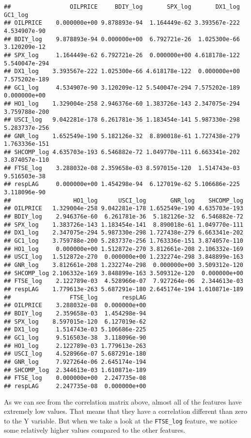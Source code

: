 \documentclass[
]{article}
\begin{document}
\begin{verbatim}
##                 OILPRICE     BDIY_log       SPX_log       DX1_log       GC1_log
## OILPRICE    0.000000e+00 9.878893e-94  1.164449e-62 3.393567e-222  4.534907e-90
## BDIY_log    9.878893e-94 0.000000e+00  6.792721e-26  1.025300e-66  3.120209e-12
## SPX_log     1.164449e-62 6.792721e-26  0.000000e+00 4.618178e-122 5.540047e-294
## DX1_log    3.393567e-222 1.025300e-66 4.618178e-122  0.000000e+00 7.575202e-189
## GC1_log     4.534907e-90 3.120209e-12 5.540047e-294 7.575202e-189  0.000000e+00
## HO1_log    1.329004e-258 2.946376e-60 1.383726e-143 2.347075e-294 3.759788e-200
## USCI_log   9.042281e-178 6.261781e-36 1.183454e-141 5.987330e-298 5.283737e-256
## GNR_log    1.652549e-190 5.182126e-32  8.890018e-61 1.727438e-279 1.763336e-151
## SHCOMP_log 4.635703e-193 6.546882e-72 1.049770e-111 6.663341e-202 3.874057e-110
## FTSE_log    3.288032e-08 2.359658e-03 8.597015e-120  1.514743e-03  9.516503e-38
## respLAG     0.000000e+00 1.454298e-94  6.127019e-62 5.106686e-225  3.118096e-90
##                  HO1_log      USCI_log       GNR_log    SHCOMP_log
## OILPRICE   1.329004e-258 9.042281e-178 1.652549e-190 4.635703e-193
## BDIY_log    2.946376e-60  6.261781e-36  5.182126e-32  6.546882e-72
## SPX_log    1.383726e-143 1.183454e-141  8.890018e-61 1.049770e-111
## DX1_log    2.347075e-294 5.987330e-298 1.727438e-279 6.663341e-202
## GC1_log    3.759788e-200 5.283737e-256 1.763336e-151 3.874057e-110
## HO1_log     0.000000e+00 1.512872e-270 3.812661e-208 2.106332e-169
## USCI_log   1.512872e-270  0.000000e+00 1.232274e-298 3.848899e-163
## GNR_log    3.812661e-208 1.232274e-298  0.000000e+00 3.509312e-120
## SHCOMP_log 2.106332e-169 3.848899e-163 3.509312e-120  0.000000e+00
## FTSE_log    2.122789e-03  4.528966e-07  7.927264e-06  2.344613e-03
## respLAG    1.779613e-263 5.687291e-180 2.645174e-194 1.610871e-189
##                 FTSE_log       respLAG
## OILPRICE    3.288032e-08  0.000000e+00
## BDIY_log    2.359658e-03  1.454298e-94
## SPX_log    8.597015e-120  6.127019e-62
## DX1_log     1.514743e-03 5.106686e-225
## GC1_log     9.516503e-38  3.118096e-90
## HO1_log     2.122789e-03 1.779613e-263
## USCI_log    4.528966e-07 5.687291e-180
## GNR_log     7.927264e-06 2.645174e-194
## SHCOMP_log  2.344613e-03 1.610871e-189
## FTSE_log    0.000000e+00  2.247735e-08
## respLAG     2.247735e-08  0.000000e+00
\end{verbatim}

As we can see from the correlation matrix above, almost all of the
features have extremely low values. That means that they have a
correlation different than zero to the Y variable. But when we take a
look at the \texttt{FTSE\_log} feature, we notice some relatively higher
values compared to the other features.
\end{document}
